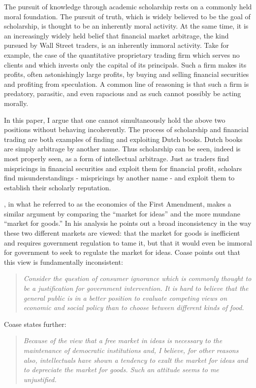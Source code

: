 \documentclass[11pt,]{article}
\begin{document}
The pursuit of knowledge through academic scholarship rests on a
commonly held moral foundation. The pursuit of truth, which is widely
believed to be the goal of scholarship, is thought to be an inherently
moral activity. At the same time, it is an increasingly widely held
belief that financial market arbitrage, the kind pursued by Wall Street
traders, is an inherently immoral activity. Take for example, the case
of the quantitative proprietary trading firm which serves no clients and
which invests only the capital of its principals. Such a firm makes its
profits, often astonishingly large profits, by buying and selling
financial securities and profiting from speculation. A common line of
reasoning is that such a firm is predatory, parasitic, and even
rapacious and as such cannot possibly be acting morally.

In this paper, I argue that one cannot simultaneously hold the above two
positions without behaving incoherently. The process of scholarship and
financial trading are both examples of finding and exploiting Dutch
books. Dutch books are simply arbitrage by another name. Thus
scholarship can be seen, indeed is most properly seen, as a form of
intellectual arbitrage. Just as traders find mispricings in financial
securities and exploit them for financial profit, scholars find
misunderstandings - mispricings by another name - and exploit them to
establish their scholarly reputation.

\citet{Coase1974}, in what he referred to as the economics of the First
Amendment, makes a similar argument by comparing the ``market for
ideas'' and the more mundane ``market for goods.'' In his analysis he
points out a broad inconsistency in the way these two different markets
are viewed: that the market for goods is inefficient and requires
government regulation to tame it, but that it would even be immoral for
government to seek to regulate the market for ideas. Coase points out
that this view is fundamentally inconsistent:

\begin{quote}
\emph{Consider the question of consumer ignorance which is commonly
thought to be a justification for government intervention. It is hard to
believe that the general public is in a better position to evaluate
competing views on economic and social policy than to choose between
different kinds of food.}
\end{quote}

Coase states further:

\begin{quote}
\emph{Because of the view that a free market in ideas is necessary to
the maintenance of democratic institutions and, I believe, for other
reasons also, intellectuals have shown a tendency to exalt the market
for ideas and to depreciate the market for goods. Such an attitude seems
to me unjustified.}
\end{quote}
\end{document}
